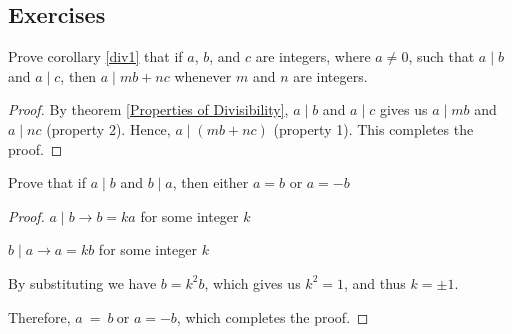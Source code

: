     \subsection{Exercises}
    \begin{exercise}
        Prove corollary \ref{div1} that if $a$, $b$, and $c$ are integers, where $a\neq 0$, such that $a\mid b$ and $a\mid c$, then $a\mid mb + nc$ whenever $m$ and $n$ are integers.
    \end{exercise}
    \begin{proof}
        By theorem \ref{Properties of Divisibility}, $a\mid b$ and $a\mid c$ gives us $a\mid mb$
        and $a\mid nc$ (property 2). Hence, $a\mid (mb+nc)$ (property 1). This completes the proof.
    \end{proof}
    
    \begin{exercise}
        Prove that if $\displaystyle a\mid b$ and $\displaystyle b\mid a$, then either $\displaystyle a=b$ or $\displaystyle a=-b$
    \end{exercise}
    \begin{proof}
        $\displaystyle a\mid b\rightarrow b=ka$ for some integer $\displaystyle k$

        $\displaystyle b\mid a\rightarrow a=kb$ for some integer $\displaystyle k$

        By substituting we have $\displaystyle b=k^{2} b$, which gives us $\displaystyle k^{2} =1$, and thus $\displaystyle k=\pm 1$.

        Therefore, $\displaystyle a\ =\ b\ $or $\displaystyle a=-b$, which completes the proof.
    \end{proof}

